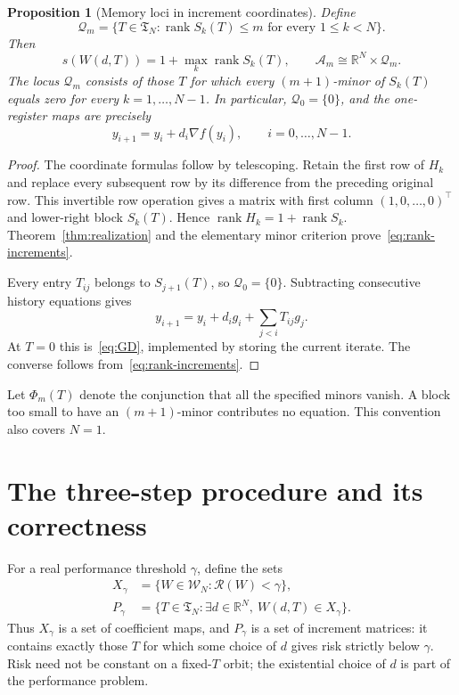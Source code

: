 \documentclass[11pt]{article}
\numberwithin{equation}{section}
\newtheorem{proposition}[theorem]{Proposition}
\theoremstyle{definition}
\newcommand{\R}{\mathbb R}
\newcommand{\W}{\mathcal W_N}
\newcommand{\A}{\mathcal A}
\newcommand{\Q}{\mathcal Q}
\newcommand{\risk}{\mathcal R}
\DeclareMathOperator{\rank}{rank}
\begin{document}
\begin{proposition}[Memory loci in increment coordinates]\label{prop:loci}
Define
\begin{equation}
 \Q_m=\{T\in\mathfrak T_N:\rank S_k(T)\le m\text{ for every }1\le k<N\}.
 \label{eq:memory-locus}
\end{equation}
Then
\begin{equation}
 s(W(d,T))=1+\max_k\rank S_k(T),\qquad
 \A_m\cong\R^N\times\Q_m.
 \label{eq:rank-increments}
\end{equation}
The locus $\Q_m$ consists of those $T$ for which every $(m+1)$-minor of $S_k(T)$ equals zero for every $k=1,\ldots,N-1$. In particular, $\Q_0=\{0\}$, and the one-register maps are precisely
\begin{equation}
 y_{i+1}=y_i+d_i\nabla f(y_i),\qquad i=0,\ldots,N-1.
 \label{eq:GD}
\end{equation}
\end{proposition}
\begin{proof}
The coordinate formulas follow by telescoping. Retain the first row of $H_k$ and replace every subsequent row by its difference from the preceding original row. This invertible row operation gives a matrix with first column $(1,0,\ldots,0)^\top$ and lower-right block $S_k(T)$. Hence $\rank H_k=1+\rank S_k$. Theorem~\ref{thm:realization} and the elementary minor criterion prove~\eqref{eq:rank-increments}.

Every entry $T_{ij}$ belongs to $S_{j+1}(T)$, so $\Q_0=\{0\}$. Subtracting consecutive history equations gives
\[
 y_{i+1}=y_i+d_ig_i+\sum_{j<i}T_{ij}g_j.
\]
At $T=0$ this is~\eqref{eq:GD}, implemented by storing the current iterate. The converse follows from~\eqref{eq:rank-increments}.
\end{proof}

Let $\Phi_m(T)$ denote the conjunction that all the specified minors vanish. A block too small to have an $(m+1)$-minor contributes no equation. This convention also covers $N=1$.

\section{The three-step procedure and its correctness}
\label{sec:procedure}
For a real performance threshold $\gamma$, define the sets
\begin{equation}
 \begin{aligned}
 X_\gamma&=\{W\in\W:\risk(W)<\gamma\},\\
 P_\gamma&=\{T\in\mathfrak T_N:\exists d\in\R^N,\ W(d,T)\in X_\gamma\}.
 \end{aligned}
 \label{eq:performance}
\end{equation}
Thus $X_\gamma$ is a set of coefficient maps, and $P_\gamma$ is a set of increment matrices: it contains exactly those $T$ for which some choice of $d$ gives risk strictly below $\gamma$. Risk need not be constant on a fixed-$T$ orbit; the existential choice of $d$ is part of the performance problem.
\end{document}
